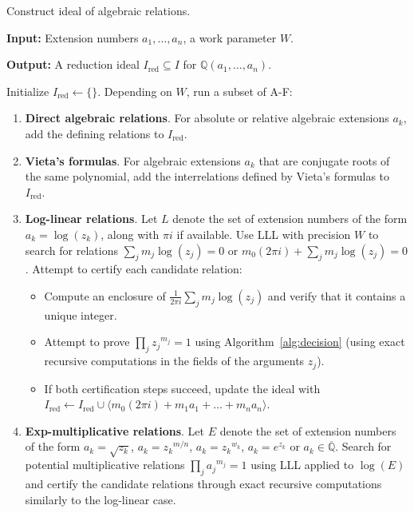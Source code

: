 \documentclass[11pt,a4paper]{article}
\begin{document}
\begin{algorithm}
\caption{Construct ideal of algebraic relations.}

\SetAlgoLined

\textbf{Input:} Extension numbers $a_1,\ldots,a_n$, a work parameter $W$.

\textbf{Output:} A reduction ideal $I_{\text{red}} \subseteq I$ for $\mathbb{Q}(a_1,\ldots,a_n)$.

\vspace*{-0.15cm}
\hrulefill
\vspace*{-0.05cm}

Initialize $I_{\text{red}} \gets \{ \}$.
Depending on $W$, run a subset of A-F:

\begin{enumerate}[{A}]
\item \textbf{Direct algebraic relations}. For absolute or relative algebraic
extensions $a_k$, add the defining relations to $I_{\text{red}}$.

\item \textbf{Vieta's formulas}. For algebraic extensions $a_k$ that are conjugate roots
of the same polynomial, add the interrelations defined by Vieta's formulas to $I_{\text{red}}$.

\item \textbf{Log-linear relations}. Let $L$ denote the set of extension numbers of the form $a_k = \log(z_k)$,
along with $\pi i$ if available.
Use LLL with precision $W$ to search for relations $\sum_j m_j \log(z_j) = 0$ or $m_0 (2 \pi i) + \sum_j m_j \log(z_j) = 0$.
Attempt to certify each candidate relation:
\begin{itemize}
\item Compute an enclosure of $\tfrac{1}{2 \pi i} \sum_j m_j \log(z_j)$ and verify that it contains a unique integer.
\item Attempt to prove $\prod_j {z_j}^{m_j} = 1$ using Algorithm~\ref{alg:decision} (using exact recursive computations in the fields of the arguments $z_j$).
\item If both certification steps succeed, update the ideal with $I_{\text{red}} \gets I_{\text{red}} \cup \langle m_0 (2 \pi i) + m_1 a_1 + \ldots + m_n a_n \rangle$.
\end{itemize}
\item \textbf{Exp-multiplicative relations}.
Let $E$ denote the set of extension numbers of the form $a_k = \sqrt{z_k}$, $a_k = {z_k}^{m/n}$, $a_k = {z_k}^{w_k}$, $a_k = e^{z_k}$ or $a_k \in \overline{\mathbb{Q}}$.
Search for potential multiplicative relations $\prod_j {a_j}^{m_j} = 1$ using LLL applied to $\log(E)$ and certify the candidate relations through exact recursive computations similarly to the log-linear case.


\end{enumerate}
\end{algorithm}
\end{document}
